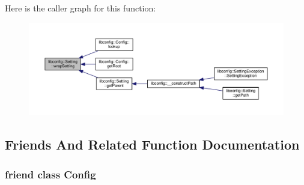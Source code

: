 Here is the caller graph for this function\-:\nopagebreak
\begin{figure}[H]
\begin{center}
\leavevmode
\includegraphics[width=350pt]{classlibconfig_1_1Setting_a0299158e1023f4a993708d09aec64c68_icgraph}
\end{center}
\end{figure}




\subsection{Friends And Related Function Documentation}
\hypertarget{classlibconfig_1_1Setting_ac3da7e21a05bf8852638db7e4dd1b81a}{
\subsubsection[{Config}]{\setlength{\rightskip}{0pt plus 5cm}friend class {\bf Config}\hspace{0.3cm}{\ttfamily [friend]}}}\label{classlibconfig_1_1Setting_ac3da7e21a05bf8852638db7e4dd1b81a}


